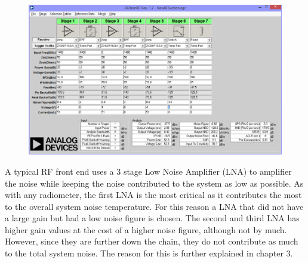{\begin{figure}[h!tb] 
\centering
\includegraphics[width=0.8\linewidth]{Images/RF_Front_end.png}
\label{ISU_Rad}
\end{figure}
}
A typical RF front end uses a 3 stage Low Noise Amplifier (LNA) to amplifier the noise while keeping the noise contributed to the system as low as possible.  As with any radiometer, the first LNA is the most critical as it contributes the most to the overall system noise temperature.  For this reason a LNA that did not have a large gain but had a low noise figure is chosen. The second and third LNA has higher gain values at the cost of a higher noise figure, although not by much.  However, since they are further down the chain, they do not contribute as much to the total system noise.  The reason for this is further explained in chapter 3. 